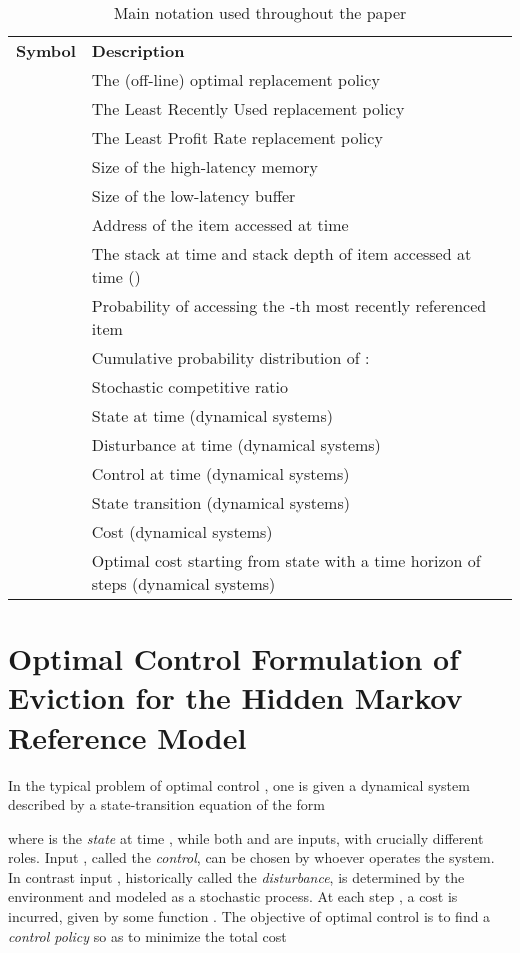 \documentclass[11pt,a4paper]{article}
\theoremstyle{definition}
\theoremstyle{remark}
\begin{document}
\newcommand{\otoprule}{\specialrule{\heavyrulewidth}{.5em}{.5em}}
\begin{table}
  \centering
  \begin{tabular}{lp{}}
    \toprule
    \textbf{Symbol} & \textbf{Description}\\
    \otoprule
     & The (off-line) optimal replacement policy\\
     & The Least Recently Used replacement policy\\
     & The Least Profit Rate replacement policy\\
     & Size of the high-latency memory\\
     & Size of the low-latency buffer\\
     & Address of the item accessed at time \\
     & The  stack at time  and  stack depth of
    item accessed at time  ()\\
     & Probability of accessing the -th most recently referenced item\\
     & Cumulative probability distribution of : \\
     & Stochastic competitive ratio\\
     & State at time  (dynamical systems)\\
     & Disturbance at time  (dynamical systems)\\
     & Control at time  (dynamical systems)\\
     & State transition (dynamical systems)\\
     & Cost (dynamical systems)\\
     & Optimal cost starting from state  with a time horizon of
     steps (dynamical systems)\\
    \bottomrule
  \end{tabular}
  \caption{Main notation used throughout the paper}
  \label{tab:notation}
\end{table}

\section{Optimal Control Formulation of Eviction for the
Hidden Markov Reference Model}
\label{sec:ocfr}

In the typical problem of optimal control \cite{Bertsekas00}, one is given a
dynamical system described by a state-transition equation of the form
 
where  is the \emph{state} at time , while both  and  are
inputs, with crucially different roles. Input , called the \emph{control},
can be chosen by whoever operates the system.  In contrast input ,
historically called the \emph{disturbance}, is determined by the environment and
modeled as a stochastic process. At each step , a cost is incurred, given by
some function . The objective of optimal control is to find a
\emph{control policy}  so as to minimize the total cost
 
\end{document}
